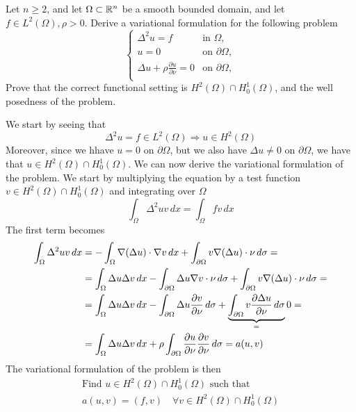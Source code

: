 \newpage
\begin{exercise}
    Let \(n \geq 2\), and let \(\Omega \subset \mathbb{R}^n\) be a smooth bounded domain, and let \(f \in L^2(\Omega), \rho > 0\). Derive a variational formulation for the following problem
    \begin{equation*}
        \begin{cases}
            \Delta^2 u = f & \text{in } \Omega, \\
            u = 0 & \text{on } \partial \Omega, \\
            \Delta u + \rho \frac{\partial u}{\partial \nu} = 0 & \text{on } \partial \Omega, \\
        \end{cases}
    \end{equation*}
    Prove that the correct functional setting is \(H^2(\Omega) \cap H^1_0(\Omega)\), and the well posedness of the problem.
\end{exercise}
We start by seeing that 
    \[
     \Delta^2 u = f \in L^2(\Omega) \Rightarrow u \in H^2(\Omega)
    \]
Moreover, since we hhave \(u = 0\) on \(\partial \Omega\), but we also have \(\Delta u \neq 0\) on \(\partial \Omega\), we have that \(u \in H^2(\Omega) \cap H^1_0(\Omega)\). We can now derive the variational formulation of the problem. We start by multiplying the equation by a test function \(v \in H^2(\Omega) \cap H^1_0(\Omega)\) and integrating over \(\Omega\)
\[
    \int_\Omega \Delta^2 u v \, dx = \int_\Omega f v \, dx
\]
The first term becomes
\begin{align*}
    \int_\Omega \Delta^2 u v \, dx &= - \int_\Omega \nabla(\Delta u) \cdot \nabla v \, dx + \int_{\partial \Omega} v \nabla(\Delta u) \cdot \nu \, d\sigma = \\
    &= \int_\Omega \Delta u \Delta v \, dx - \int_{\partial \Omega} \Delta u \nabla v \cdot \nu \, d\sigma + \int_{\partial \Omega} v \nabla(\Delta u) \cdot \nu \, d\sigma = \\
    &= \int_\Omega \Delta u \Delta v \, dx - \int_{\partial \Omega} \Delta u \frac{\partial v}{\partial \nu} \, d\sigma + \underbrace{\int_{\partial \Omega} v \frac{\partial \Delta u}{\partial \nu} \, d\sigma}_=0 = \\
    &= \int_\Omega \Delta u \Delta v \, dx + \rho \int_{\partial \Omega} \frac{\partial u}{\partial \nu} \frac{\partial v}{\partial \nu} \, d\sigma = a(u, v)
\end{align*}
The variational formulation of the problem is then
\[
    \begin{split}
        \text{Find } u \in H^2(\Omega) \cap H^1_0(\Omega) \text{ such that } \\
        a(u, v) = (f, v) \quad \forall v \in H^2(\Omega) \cap H^1_0(\Omega)
    \end{split}
\]
